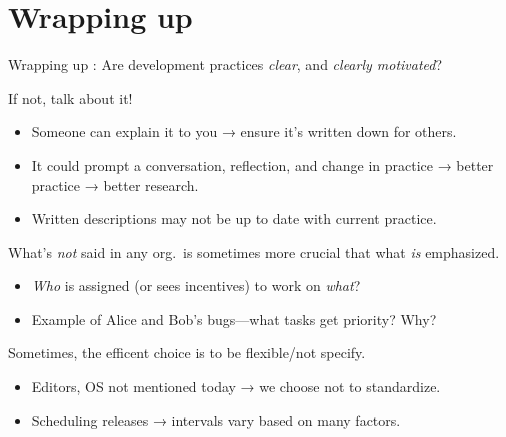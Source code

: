 \documentclass[12pt,aspectratio=169]{beamer}
\begin{document}
\section*{Wrapping up}

\begin{frame}{Wrapping up}
  : Are development practices \emph{clear}, and \emph{clearly motivated}?

  If not, talk about it!
  \begin{itemize}
    \item Someone can explain it to you → ensure it's written down for others.
    \item It could prompt a conversation, reflection, and change in practice → better practice → better research.
    \item Written descriptions may not be up to date with current practice.
  \end{itemize}

  \bigskip
  What's \emph{not} said in any org.\ is sometimes more crucial that what \emph{is} emphasized.
  \begin{itemize}
    \item \emph{Who} is assigned (or sees incentives) to work on \emph{what}?
    \item Example of Alice and Bob's bugs—what tasks get priority? Why?
  \end{itemize}

  Sometimes, the efficent choice is to be flexible/not specify.

  \begin{itemize}
    \item Editors, OS not mentioned today → we choose not to standardize.
    \item Scheduling releases → intervals vary based on many factors.
  \end{itemize}

\end{frame}

\begin{frame}[plain]

  \centering \Huge {}

\end{frame}

\appendix
\end{document}
